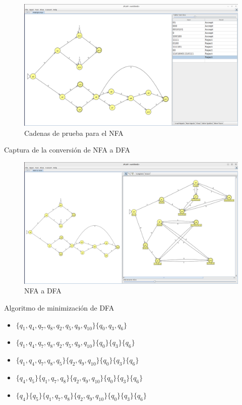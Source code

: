 \documentclass[11pt]{report}
\begin{document}
\begin{figure}[H]
  \centering
  \includegraphics[scale=0.2]{img/Mod_test.png}
  \caption{Cadenas de prueba para el NFA}
\end{figure}

\newpage

Captura de la conversión de NFA a DFA
\begin{figure}[H]
  \centering
  \includegraphics[scale=0.2]{img/mod_nfa_to_dfa.png}
  \caption{NFA a DFA}
\end{figure}

Algoritmo de minimización de DFA
\begin{itemize}
  \item $\{q_1, q_4, q_7, q_8, q_2, q_5, q_9, q_{10}\} \{q_0, q_3, q_6\}$
  \item $\{q_1, q_4, q_7, q_8, q_2, q_5, q_9, q_10\} \{q_0\} \{q_3\} \{q_6\}$
  \item $\{q_1, q_4, q_7, q_8, q_5\} \{q_2, q_9, q_10\} \{q_0\} \{q_3\} \{q_6\}$
  \item $\{q_4, q_5\} \{q_1, q_7, q_8\} \{q_2, q_9, q_10\} \{q_0\} \{q_3\} \{q_6\}$
  \item $\{q_4\} \{q_5\} \{q_1, q_7, q_8\} \{q_2, q_9, q_10\} \{q_0\} \{q_3\} \{q_6\}$
\end{itemize}
\end{document}
